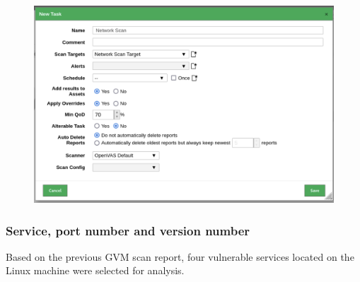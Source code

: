 \begin{figure}[H]
    \begin{center}
        \includegraphics[width=\textwidth]{Outputs/E03/gvm-task.png}
    \end{center}
\end{figure}
\subsubsection{Service, port number and version number}
Based on the previous GVM scan report, four vulnerable services located on the Linux machine were selected for analysis.

